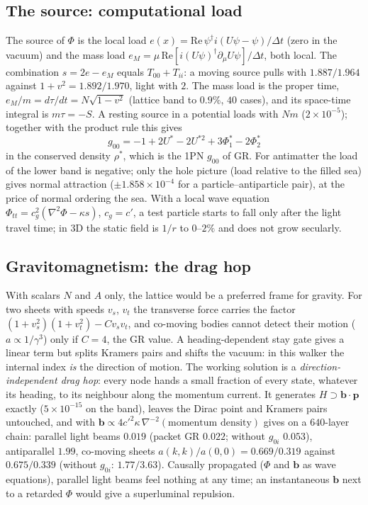 \documentclass[twocolumn,showpacs,preprintnumbers,amsmath,amssymb]{revtex4-2}
\newcommand{\cpr}{c'}
\newcommand{\bvec}{\mathbf{b}}
\newcommand{\pvec}{\mathbf{p}}
\begin{document}
\subsection{The source: computational load}

The source of $\Phi$ is the local load
$e(x)=\mathrm{Re}\,\psi^{\dagger}i(U\psi-\psi)/\Delta t$ (zero in the vacuum)
and the mass load $e_M=\mu\,\mathrm{Re}[i(U\psi)^{\dagger}\partial_\mu U\psi]/\Delta t$,
both local.
The combination $s=2e-e_M$ equals $T_{00}+T_{ii}$: a moving source pulls with
$1.887/1.964$ against $1+v^{2}=1.892/1.970$, light with $2$.
The mass load is the proper time, $e_M/m=d\tau/dt=N\sqrt{1-v^{2}}$ (lattice band
to $0.9\%$, $40$ cases), and its space-time integral is $m\tau=-S$.
A resting source in a potential loads with $N m$ ($2\times10^{-5}$); together
with the product rule this gives
\begin{equation}
  g_{00}=-1+2U^{*}-2U^{*2}+3\Phi_1^{*}-2\Phi_2^{*}
\end{equation}
in the conserved density $\rho^{*}$, which is the 1PN $g_{00}$ of GR.
For antimatter the load of the lower band is negative; only the hole picture
(load relative to the filled sea) gives normal attraction ($\pm1.858\times10^{-4}$
for a particle--antiparticle pair), at the price of normal ordering the sea.
With a local wave equation $\Phi_{tt}=c_g^{2}(\nabla^{2}\Phi-\kappa s)$,
$c_g=\cpr$, a test particle starts to fall only after the light travel time;
in 3D the static field is $1/r$ to $0$--$2\%$ and does not grow secularly.

\subsection{Gravitomagnetism: the drag hop}
\label{sec:g0i}

With scalars $N$ and $A$ only, the lattice would be a preferred frame for
gravity.
For two sheets with speeds $v_s$, $v_t$ the transverse force carries the factor
$(1+v_s^{2})(1+v_t^{2})-Cv_sv_t$, and co-moving bodies cannot detect their
motion ($a\propto1/\gamma^{3}$) only if $C=4$, the GR value.
A heading-dependent stay gate gives a linear term but splits Kramers pairs and
shifts the vacuum: in this walker the internal index \emph{is} the direction
of motion.
The working solution is a \emph{direction-independent drag hop}: every node
hands a small fraction of every state, whatever its heading, to its neighbour
along the momentum current.
It generates $H\supset\bvec\cdot\pvec$ exactly ($5\times10^{-15}$ on the band),
leaves the Dirac point and Kramers pairs untouched, and with
$\bvec\propto4\cpr^{2}\kappa\,\nabla^{-2}(\text{momentum density})$ gives on a
$640$-layer chain: parallel light beams $0.019$ (packet GR $0.022$; without
$g_{0i}$ $0.053$), antiparallel $1.99$, co-moving sheets
$a(k,k)/a(0,0)=0.669/0.319$ against $0.675/0.339$ (without $g_{0i}$:
$1.77/3.63$).
Causally propagated ($\Phi$ and $\bvec$ as wave equations), parallel light
beams feel nothing at any time; an instantaneous $\bvec$ next to a retarded
$\Phi$ would give a superluminal repulsion.
\end{document}
